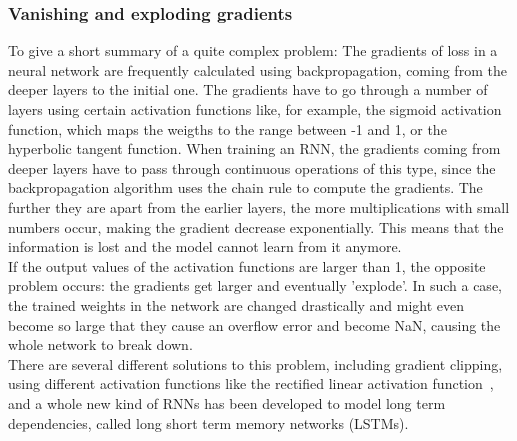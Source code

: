 \documentclass[
a4paper,
pagesize,
pdftex,
12pt,
twoside, %
BCOR=5mm, %
ngerman,
fleqn,
final,
]{scrartcl}
\begin{document}
	\subsubsection{Vanishing and exploding gradients}
	To give a short summary of a quite complex problem: The gradients of loss in a neural network are frequently calculated using backpropagation, coming from the deeper layers to the initial one. The gradients have to go through a number of layers using certain activation functions like, for example, the sigmoid activation function, which maps the weigths to the range between -1 and 1, or the hyperbolic tangent function. When training an RNN, the gradients coming from deeper layers have to pass through continuous operations of this type, since the backpropagation algorithm uses the chain rule to compute the gradients. The further they are apart from the earlier layers, the more multiplications with small numbers occur, making the gradient decrease exponentially. This means that the information is lost and the model cannot learn from it anymore.\\
	If the output values of the activation functions are larger than 1, the opposite problem occurs: the gradients get larger and eventually 'explode'. In such a case, the trained weights in the network are changed drastically and might even become so large that they cause an overflow error and become NaN, causing the whole network to break down.\\
	There are several different solutions to this problem, including gradient clipping, using different activation functions like the rectified linear activation function~\cite{Glorot.2011}, and a whole new kind of RNNs has been developed to model long term dependencies, called long short term memory networks (LSTMs).
	
\end{document}
